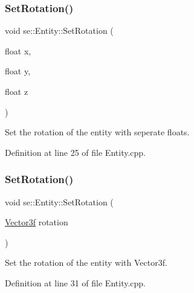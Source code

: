 \mbox{\label{classse_1_1_entity_a41f820b99b2b6d76c97472dcddca7fa2}} 
\subsubsection{\texorpdfstring{Set\+Rotation()}{SetRotation()}\hspace{0.1cm}{\footnotesize\ttfamily [1/2]}}
{\footnotesize\ttfamily void se\+::\+Entity\+::\+Set\+Rotation (\begin{DoxyParamCaption}\item[{float}]{x,  }\item[{float}]{y,  }\item[{float}]{z }\end{DoxyParamCaption})\hspace{0.3cm}{\ttfamily [virtual]}}

Set the rotation of the entity with seperate floats. 

Definition at line 25 of file Entity.\+cpp.

\mbox{\label{classse_1_1_entity_a950373cfaaad7ad4bba06f3ab8534efd}} 
\subsubsection{\texorpdfstring{Set\+Rotation()}{SetRotation()}\hspace{0.1cm}{\footnotesize\ttfamily [2/2]}}
{\footnotesize\ttfamily void se\+::\+Entity\+::\+Set\+Rotation (\begin{DoxyParamCaption}\item[{\mbox{\hyperlink{namespacese_a12e07512d95e2fdebdaf74a5ea2cf5f6}{Vector3f}}}]{rotation }\end{DoxyParamCaption})\hspace{0.3cm}{\ttfamily [virtual]}}

Set the rotation of the entity with Vector3f. 

Definition at line 31 of file Entity.\+cpp.

\mbox{\label{classse_1_1_entity_a812b63adcbf5f1a3e429a31c6e0ff940}} 
